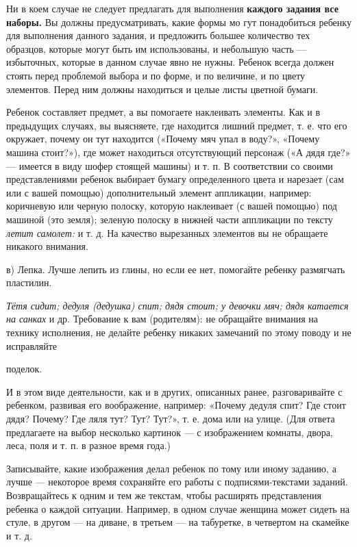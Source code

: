 \documentclass{book}
\renewcommand{\emph}[1]{\textit{#1}}
\begin{document}
Ни в коем случае не следует предлагать для выполнения \textbf{каждого
задания все наборы.} Вы должны предусматривать, какие формы мо гут
понадобиться ребенку для выполнения данного задания, и предложить
большее количество тех образцов, которые могут быть им использованы, и
небольшую часть --- избыточных, которые в данном случае явно не нужны.
Ребенок всегда должен стоять перед проблемой выбора и по форме, и по
величине, и по цвету элементов. Перед ним должны находиться и целые
листы цветной бумаги.

Ребенок составляет предмет, а вы помогаете наклеивать элементы. Как и в
предыдущих случаях, вы выясняете, где находится лишний предмет, т. е.
что его окружает, почему он тут находится («Почему мяч упал в воду?»,
«Почему машина стоит?»), где может находиться отсутствующий персонаж («А
дядя где?» --- имеется в виду шофер стоящей машины) и т. п. В
соответствии со своими представлениями ребенок выбирает бумагу
определенного цвета и нарезает (сам или с вашей помощью) дополнительный
элемент аппликации, например: коричневую или черную полоску, которую
наклеивает (с вашей помощью) под машиной (это земля); зеленую полоску в
нижней части аппликации по тексту \emph{летит самолет:} и т. д. На
качество вырезанных элементов вы не обращаете никакого внимания.

в) Лепка. Лучше лепить из глины, но если ее нет, помогайте ребенку
размягчать пластилин.

\emph{Тётя сидит; дедуля (дедушка) спит; дядя стоит; у девочки мяч; дядя
катается на санках} и др. Требование к вам (родителям): не обращайте
внимания на технику исполнения, не делайте ребенку никаких замечаний по
этому поводу и не исправляйте

поделок.

И в этом виде деятельности, как и в других, описанных ранее,
разговаривайте с ребенком, развивая его воображение, например: «Почему
дедуля спит? Где стоит дядя? Почему? Где ляля тут? Тут? Тут?», т. е.
дома или на улице. (Для ответа предлагаете на выбор несколько картинок
--- с изображением комнаты, двора, леса, поля и т. п. в разное время
года.)

Записывайте, какие изображения делал ребенок по тому или иному заданию,
а лучше --- некоторое время сохраняйте его работы с подписями-текстами
заданий. Возвращайтесь к одним и тем же текстам, чтобы расширять
представления ребенка о каждой ситуации. Например, в одном случае
женщина может сидеть на стуле, в другом --- на диване, в третьем --- на
табуретке, в четвертом на скамейке и т. д.
\end{document}
